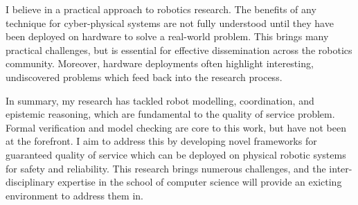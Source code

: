 \documentclass[12pt]{article}
\begin{document}
I believe in a practical approach to robotics research.
%
The benefits of any technique for cyber-physical systems are not fully understood until they have been deployed on hardware to solve a real-world problem.
%
This brings many practical challenges, but is essential for effective dissemination across the robotics community.
%
Moreover, hardware deployments often highlight interesting, undiscovered problems which feed back into the research process.



In summary, my research has tackled robot modelling, coordination, and epistemic reasoning, which are fundamental to the quality of service problem.
%
Formal verification and model checking are core to this work, but have not been at the forefront.
%
I aim to address this by developing novel frameworks for guaranteed quality of service which can be deployed on physical robotic systems for safety and reliability.
%
This research brings numerous challenges, and the inter-disciplinary expertise in the school of computer science will provide an exicting environment to address them in.

\iffalse
My existing work has opened multiple future strands of research.
%
How can we retain richer forms of uncertainty in our models while controlling their size?
%
How can we develop more scalable decision-making techniques which exploit rich models to synthesise efficient and robust robot behaviour?
%
Further to this, how can we simultaneously verify robot behaviour during decision-making on large, complex models in a tractable way?
%
How can we incorporate epistemic uncertainty into simultaneous decision-making and verification methods?
%
These questions require varied solutions, and the inter-disciplinary expertise in the school of computer science will provide a great environment to foster new collaborations to address these challenges.
\fi
\end{document}
